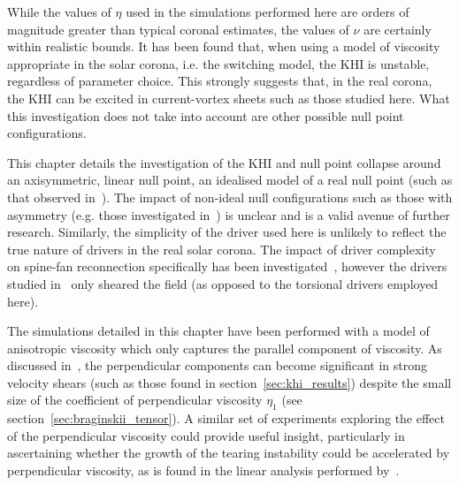 While the values of $\eta$ used in the simulations performed here are orders of magnitude greater than typical coronal estimates, the values of $\nu$ are certainly within realistic bounds. It has been found that, when using a model of viscosity appropriate in the solar corona, i.e. the switching model, the KHI is unstable, regardless of parameter choice. This strongly suggests that, in the real corona, the KHI can be excited in current-vortex sheets such as those studied here. What this investigation does not take into account are other possible null point configurations.

This chapter details the investigation of the KHI and null point collapse around an axisymmetric, linear null point, an idealised model of a real null point (such as that observed in~\cite{massonNATUREFLARERIBBONS2009}). The impact of non-ideal null configurations such as those with asymmetry (e.g. those investigated in~\cite{thurgoodImplosiveCollapseMagnetic2018,pontinWhyAreFlare2016a}) is unclear and is a valid avenue of further research. Similarly, the simplicity of the driver used here is unlikely to reflect the true nature of drivers in the real solar corona. The impact of driver complexity on spine-fan reconnection specifically has been investigated~\cite{wyperSpinefanReconnectionInfluence2012}, however the drivers studied in~\cite{wyperSpinefanReconnectionInfluence2012} only sheared the field (as opposed to the torsional drivers employed here). 


The simulations detailed in this chapter have been performed with a model of anisotropic viscosity which only captures the parallel component of viscosity. As discussed in~\cite{einaudiResistiveInstabilitiesFlowing1989}, the perpendicular components can become significant in strong velocity shears (such as those found in section~\ref{sec:khi_results}) despite the small size of the coefficient of perpendicular viscosity $\eta_1$ (see section~\ref{sec:braginskii_tensor}). A similar set of experiments exploring the effect of the perpendicular viscosity could provide useful insight, particularly in ascertaining whether the growth of the tearing instability could be accelerated by perpendicular viscosity, as is found in the linear analysis performed by~\cite{einaudiResistiveInstabilitiesFlowing1989}.


